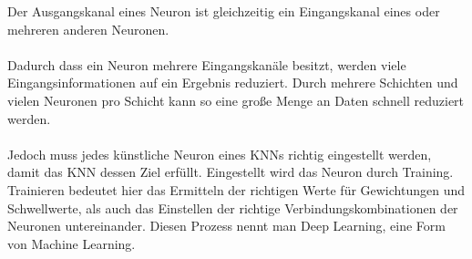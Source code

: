 \documentclass[12pt,oneside,a4paper,parskip]{scrbook}
\begin{document}
Der Ausgangskanal eines Neuron ist gleichzeitig ein Eingangskanal eines oder mehreren anderen Neuronen. %
\\\\
Dadurch dass ein Neuron mehrere Eingangskanäle besitzt, werden viele Eingangsinformationen auf ein Ergebnis reduziert. Durch mehrere Schichten und vielen Neuronen pro Schicht kann so eine große Menge an Daten schnell reduziert werden.
\\\\
Jedoch muss jedes künstliche Neuron eines KNNs richtig eingestellt werden, damit das KNN dessen Ziel erfüllt. Eingestellt wird das Neuron durch Training. Trainieren bedeutet hier das Ermitteln der richtigen Werte für Gewichtungen und Schwellwerte, als auch das Einstellen der richtige Verbindungskombinationen der Neuronen untereinander. Diesen Prozess nennt man Deep Learning, eine Form von Machine Learning.
\end{document}
